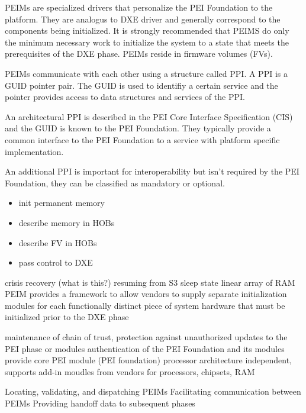 \begin{enumerate}
    PEIMs are specialized drivers that personalize the PEI Foundation to the platform. They are analogus to DXE driver and generally correspond to the components being initialized. It is strongly recommended that PEIMS do only the minimum necessary work to initialize the system to a state that meets the prerequisites of the DXE phase. PEIMs reside in firmware volumes (FVs).

    PEIMs communicate with each other using a structure called PPI. A PPI is a GUID pointer pair. The GUID is used to identifiy a certain service and the pointer provides access to data structures and services of the PPI.


    An architectural PPI is described in the PEI Core Interface Specification (CIS) and the GUID is known to the PEI Foundation. They typically provide a common interface to the PEI Foundation to a service with platform specific implementation.

    An additional PPI is important for interoperability but isn't required by the PEI Foundation, they can be classified as mandatory or optional.


    \begin{itemize}
        \item init permanent memory
        \item describe memory in \acp{HOB}
        \item describe \ac{FV} in \acp{HOB}
        \item pass control to \ac{DXE}
    \end{itemize}

    crisis recovery (what is this?)
    resuming from S3 sleep state
    linear array of RAM
    \ac{PEIM} provides a framework to allow vendors to supply separate initialization modules for
    each functionally distinct piece of system hardware that must be initialized prior to the DXE phase\cite{pi-spec}

    maintenance of chain of trust, protection against unauthorized updates to the PEI phase or modules
    authentication of the PEI Foundation and its modules
    provide core PEI module (PEI foundation) processor architecture independent, supports add-in moudles from vendors for processors, chipsets, RAM

    Locating, validating, and dispatching PEIMs
    Facilitating communication between PEIMs
    Providing handoff data to subsequent phases


\end{enumerate}
